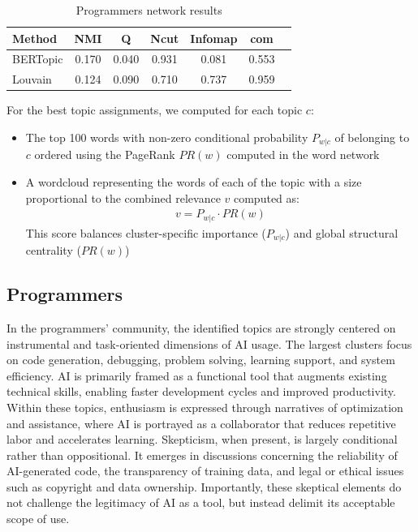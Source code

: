 \documentclass[conference]{IEEEtran}
\begin{document}
\begin{table}[htbp]
\centering
\caption{Programmers network results}
\label{tab:prog_topic_metrics}
\begin{tabular}{l c c c c c c}
\hline
Method & NMI & Q & Ncut & Infomap & com \\
\hline
BERTopic & 0.170 & 0.040 & 0.931 & 0.081 & 0.553 \\
Louvain & 0.124 & 0.090 & 0.710 & 0.737 & 0.959 \\
\hline
\end{tabular}
\end{table}
For the best topic assignments, we computed for each topic $c$:
\begin{itemize}
    \item The top 100 words with non-zero conditional probability $P_{w|c}$ of belonging to $c$ ordered using the PageRank $PR(w)$ computed in the word network
    \item A wordcloud representing the words of each of the topic with a size proportional to the combined relevance $v$ computed as:
    \begin{align*}
        v = P_{w|c} \cdot PR(w)
    \end{align*}
    This score balances cluster-specific importance ($P_{w|c}$) and global structural centrality ($PR(w)$)
\end{itemize}

\subsection{Programmers}
In the programmers’ community, the identified topics are strongly centered on instrumental and task-oriented dimensions of AI usage. The largest clusters focus on code generation, debugging, problem solving, learning support, and system efficiency. AI is primarily framed as a functional tool that augments existing technical skills, enabling faster development cycles and improved productivity. Within these topics, enthusiasm is expressed through narratives of optimization and assistance, where AI is portrayed as a collaborator that reduces repetitive labor and accelerates learning. Skepticism, when present, is largely conditional rather than oppositional. It emerges in discussions concerning the reliability of AI-generated code, the transparency of training data, and legal or ethical issues such as copyright and data ownership. Importantly, these skeptical elements do not challenge the legitimacy of AI as a tool, but instead delimit its acceptable scope of use.
\end{document}

